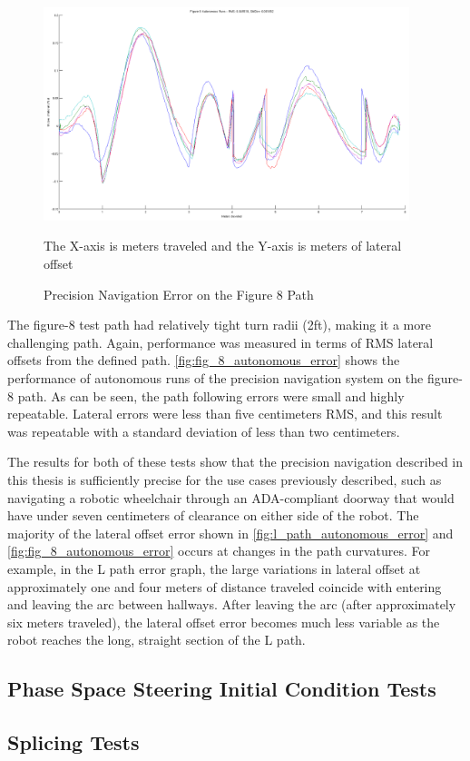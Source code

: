 \begin{figure}
\centering
\includegraphics[width=0.95\textwidth]{images/fig_8_autonomous_error}
\caption{Precision Navigation Error on the Figure 8 Path \label{fig:fig_8_autonomous_error}}{The X-axis is meters traveled and the Y-axis is meters of lateral offset}
\end{figure}

The figure-8 test path had relatively tight turn radii (2ft), making it a more challenging path. Again, performance was measured in terms of RMS lateral offsets from the defined path. \autoref{fig:fig_8_autonomous_error} shows the performance of autonomous runs of the precision navigation system on the figure-8 path. As can be seen, the path following errors were small and highly repeatable. Lateral errors were less than five centimeters RMS, and this result was repeatable with a standard deviation of less than two centimeters.

The results for both of these tests show that the precision navigation described in this thesis is sufficiently precise for the use cases previously described, such as navigating a robotic wheelchair through an ADA-compliant doorway that would have under seven centimeters of clearance on either side of the robot. The majority of the lateral offset error shown in \autoref{fig:l_path_autonomous_error} and \autoref{fig:fig_8_autonomous_error} occurs at changes in the path curvatures. For example, in the L path error graph, the large variations in lateral offset at approximately one and four meters of distance traveled coincide with entering and leaving the arc between hallways. After leaving the arc (after approximately six meters traveled), the lateral offset error becomes much less variable as the robot reaches the long, straight section of the L path.

\subsection{Phase Space Steering Initial Condition Tests}\label{subsec:phase_space_steering_skills}

\subsection{Splicing Tests}\label{subsec:splicing_tests}

